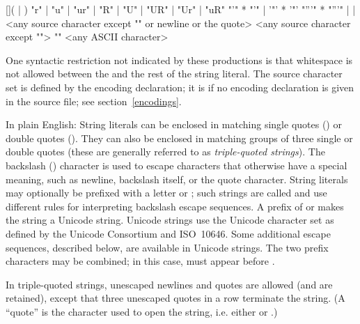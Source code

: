 \begin{productionlist}
             {[]( | )}
             {"r" | "u" | "ur" | "R" | "U" | "UR" | "Ur" | "uR"}
             {"'" * "'"
              | '"' * '"'}
             {"'''" * "'''"}
             { | }
             { | }
             {<any source character except "\e" or newline or the quote>}
             {<any source character except "\e">}
             {"\e" <any ASCII character>}
\end{productionlist}

One syntactic restriction not indicated by these productions is that
whitespace is not allowed between the  and
the rest of the string literal. The source character set is defined
by the encoding declaration; it is \ASCII{} if no encoding declaration
is given in the source file; see section~\ref{encodings}.

In plain English: String literals can be enclosed in matching single
quotes () or double quotes ().  They can also be
enclosed in matching groups of three single or double quotes (these
are generally referred to as \emph{triple-quoted strings}).  The
backslash (\code{\e}) character is used to escape characters that
otherwise have a special meaning, such as newline, backslash itself,
or the quote character.  String literals may optionally be prefixed
with a letter  or ; such strings are called
 and use different rules for interpreting
backslash escape sequences.  A prefix of  or 
makes the string a Unicode string.  Unicode strings use the Unicode character
set as defined by the Unicode Consortium and ISO~10646.  Some additional
escape sequences, described below, are available in Unicode strings.
The two prefix characters may be combined; in this case,  must
appear before .

In triple-quoted strings,
unescaped newlines and quotes are allowed (and are retained), except
that three unescaped quotes in a row terminate the string.  (A
``quote'' is the character used to open the string, i.e. either
 or .)

